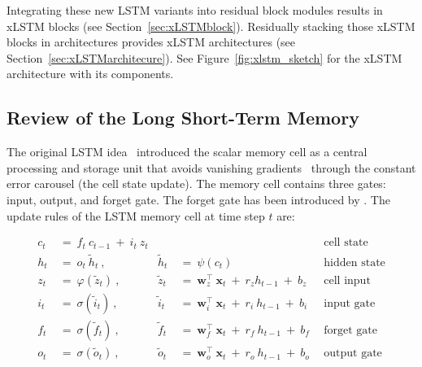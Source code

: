 Integrating these new LSTM variants into residual block modules results in xLSTM blocks (see Section~\ref{sec:xLSTMblock}). Residually stacking those xLSTM blocks in architectures provides xLSTM architectures (see Section~\ref{sec:xLSTMarchitecure}).
See Figure~\ref{fig:xlstm_sketch} for the xLSTM architecture with its components.

\subsection{Review of the Long Short-Term Memory}
\label{sec:orgLSTM}

The original LSTM idea~\citep{Hochreiter:91,Hochreiter:97nips,Hochreiter:97} introduced the scalar memory cell as a central processing and storage unit that avoids vanishing gradients~\citep{Hochreiter:91,Hochreiter:00book} through the constant error carousel (the cell state update). The memory cell contains three gates: input, output, and forget gate. The forget gate has been introduced by \citet{Gers:00}. 
The update rules of the LSTM memory cell at time step $t$ are:

\begin{align}
c_t \ &= \  f_t \ c_{t-1} \ + \ i_t \ z_t &  & &\text{cell state} \\
h_t  \ &= \ o_t \ \tilde{h}_t \ , & \tilde{h}_t \ &= \ \psi \left( c_t\right)
  &\text{hidden state} \\
z_t \ &= \ \varphi \left( \tilde{z}_t \right) \ , 
  &\tilde{z}_t \ &=  \ \mathbf{w}^\top_{z} \ \mathbf{x}_t \ + \
  r_{z}  h_{t-1} \ + \  b_{z} \ \
  &\text{cell input} \\
i_t \ &= \ \sigma \left( \tilde{i}_t  \right) \ , 
  &\tilde{i}_t \ &= \ \mathbf{w}^\top_{i} \ \mathbf{x}_t \ + \
  r_{i}  \ h_{t-1} \ + \  b_{i} \ \
  &\text{input gate} \\
f_t \ &= \ \sigma \left(  \tilde{f}_t \right) \ , 
  &\tilde{f}_t \ &= \ \mathbf{w}^\top_{f} \ \mathbf{x}_t  \ + \
  r_{f}  \ h_{t-1} \ + \  b_{f} \ \
  &\text{forget gate} \\
o_t \ &= \ \sigma \left( \tilde{o}_t \right) \ , 
  &\tilde{o}_t  \ &= \ \mathbf{w}^\top_{o} \ \mathbf{x}_t \ + \
  r_{o}  \ h_{t-1} \ + \  b_{o} \ \
  &\text{output gate} 
\end{align}

